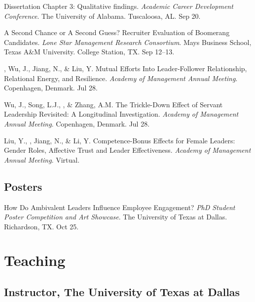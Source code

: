\begin{entries}
     Dissertation Chapter 3: Qualitative findings. \textit{Academic Career Development Conference}. The University of Alabama. Tuscaloosa, AL. Sep 20.

     A Second Chance or A Second Guess? Recruiter Evaluation of Boomerang Candidates. \textit{ Lone Star Management Research Consortium}.  Mays Business School, Texas A\&M University. College Station, TX. Sep 12--13.

    , Wu, J., Jiang, N., \& Liu, Y. Mutual Efforts Into Leader-Follower Relationship, Relational Energy, and Resilience. \textit{Academy of Management Annual Meeting}. Copenhagen, Denmark. Jul 28.

    Wu, J., Song, L.J., , \& Zhang, A.M. The Trickle-Down Effect of Servant Leadership Revisited: A Longitudinal Investigation. \textit{Academy of Management Annual Meeting}. Copenhagen, Denmark. Jul 28.

    Liu, Y., , Jiang, N., \& Li, Y. Competence-Bonus Effects for Female Leaders: Gender Roles, Affective Trust and Leader Effectiveness. \textit{Academy of Management Annual Meeting}. Virtual.
\end{entries}


\subsection*{Posters}

\begin{entries}
     How Do Ambivalent Leaders Influence Employee Engagement? \textit{PhD Student Poster Competition and Art Showcase}. The University of Texas at Dallas. Richardson, TX. Oct 25.

\end{entries}

\fi


\section*{Teaching}

\ifcvmedium
\subsection*{Instructor, The University of Texas at Dallas}

